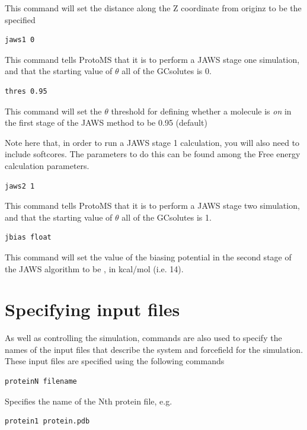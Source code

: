 \documentclass[letterpaper,10pt,english]{manual}
\begin{document}
This command will set the distance along the Z coordinate from originz to be the specified 
\begin{Verbatim}[commandchars=@\[\]]
jaws1 0
\end{Verbatim}

This command tells ProtoMS that it is to perform a JAWS stage one simulation, and that the starting value of $\theta$ all of the GCsolutes is 0.
\begin{Verbatim}[commandchars=@\[\]]
thres 0.95
\end{Verbatim}

This command will set the $\theta$ threshold for defining whether a molecule is \emph{on} in the first stage of the JAWS method to be 0.95 (default)

Note here that, in order to run a JAWS stage 1 calculation, you will also need to include softcores. The parameters to do this can be found among the Free energy calculation parameters.
\begin{Verbatim}[commandchars=@\[\]]
jaws2 1
\end{Verbatim}

This command tells ProtoMS that it is to perform a JAWS stage two simulation, and that the starting value of $\theta$ all of the GCsolutes is 1.
\begin{Verbatim}[commandchars=@\[\]]
jbias float
\end{Verbatim}

This command will set the value of the biasing potential in the second stage of the JAWS algorithm to be , in kcal/mol (i.e. 14).
\hypertarget{incmd}{}

\section{Specifying input files}

As well as controlling the simulation, commands are also used to specify the names of the input files that describe the system and forcefield for the simulation. These input files are specified using the following commands
\begin{Verbatim}[commandchars=@\[\]]
proteinN filename
\end{Verbatim}

Specifies the name of the Nth protein file, e.g.

\begin{Verbatim}[commandchars=@\[\]]
protein1 protein.pdb
\end{Verbatim}
\end{document}
